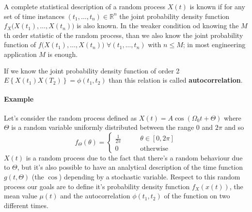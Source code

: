 	A complete statistical description of a random process $X(t)$ is known if for any set of time instances $(t_1,\dots, t_n) \in \mathds R^n$ the joint probability density function $f_X\big(X(t_1), \dots, X(t_n) \big)$ is also known. In the weaker condition od knowing the $M$th order statistic of the random process, than we also know the joint probability function of $f\big(X(t_1), \dots, X(t_n)\big)$ $ \forall (t_1,\dots,t_n)$ with $n\leq M$; in most engineering application $M$ is enough.
	
	If we know   the joint probability density function of order 2 $E\left\{X(t_1)X(T_2)\right\} = \phi(t_1,t_2)$ than this relation is called \textbf{autocorrelation}.
	
	\paragraph{Example} Let's consider the random process defined as $X(t) = A \cos(\Omega_0t + \Theta)$ where $\Theta$ is a random variable uniformly distributed between the range $0$ and $2\pi$ and so
	\[ f_\Theta(\theta) = \begin{cases}
		\frac 1 {2\pi} \qquad & \theta \in [0,2\pi] \\
		0 & \textrm{otherwise}
	\end{cases}\]
	$X(t)$ is a random process due to the fact that there's a random behaviour due to $\Theta$, but it's also possible to have an analytical description of the time function $g(t,\Theta)$ (the $\cos$) depending by a stochastic variable. Respect to this random process our goals are to define it's probability density function $f_X(x(t))$, the mean value $\mu(t)$ and the autocorrelation $\phi(t_1,t_2)$ of the function on two different times.
